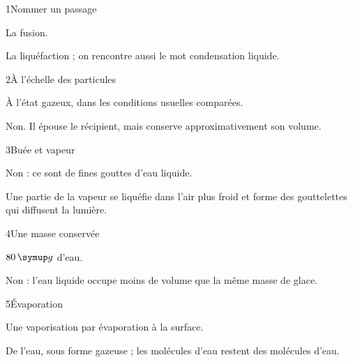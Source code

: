 \par\noindent\begin{minipage}{\linewidth}
\begin{corrige}{1}{Nommer un passage}
\begin{questions}
\item La fusion.
\item La liquéfaction ; on rencontre aussi le mot condensation liquide.
\end{questions}
\end{corrige}
\end{minipage}
\par\noindent\begin{minipage}{\linewidth}
\begin{corrige}{2}{À l’échelle des particules}
\begin{questions}
\item À l’état gazeux, dans les conditions usuelles comparées.
\item Non. Il épouse le récipient, mais conserve approximativement son volume.
\end{questions}
\end{corrige}
\end{minipage}
\par\noindent\begin{minipage}{\linewidth}
\begin{corrige}{3}{Buée et vapeur}
\begin{questions}
\item Non : ce sont de fines gouttes d’eau liquide.
\item Une partie de la vapeur se liquéfie dans l’air plus froid et forme des gouttelettes qui diffusent la lumière.
\end{questions}
\end{corrige}
\end{minipage}
\par\noindent\begin{minipage}{\linewidth}
\begin{corrige}{4}{Une masse conservée}
\begin{questions}
\item $80\unite g$ d’eau.
\item Non : l’eau liquide occupe moins de volume que la même masse de glace.
\end{questions}
\end{corrige}
\end{minipage}
\par\noindent\begin{minipage}{\linewidth}
\begin{corrige}{5}{Évaporation}
\begin{questions}
\item Une vaporisation par évaporation à la surface.
\item De l’eau, sous forme gazeuse ; les molécules d’eau restent des molécules d’eau.
\end{questions}
\end{corrige}
\end{minipage}

